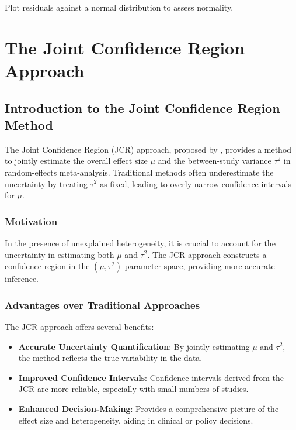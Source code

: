 \documentclass[12pt,a4paper]{report}
\begin{document}
Plot residuals against a normal distribution to assess normality.

\chapter{The Joint Confidence Region Approach}
\label{chap:jcr_approach}

\section{Introduction to the Joint Confidence Region Method}
\label{sec:intro_jcr}

The Joint Confidence Region (JCR) approach, proposed by \citet{yekutieli2019getting}, provides a method to jointly estimate the overall effect size $\mu$ and the between-study variance $\tau^2$ in random-effects meta-analysis. Traditional methods often underestimate the uncertainty by treating $\tau^2$ as fixed, leading to overly narrow confidence intervals for $\mu$.

\subsection{Motivation}
\label{subsec:jcr_motivation}

In the presence of unexplained heterogeneity, it is crucial to account for the uncertainty in estimating both $\mu$ and $\tau^2$. The JCR approach constructs a confidence region in the $(\mu, \tau^2)$ parameter space, providing more accurate inference.

\subsection{Advantages over Traditional Approaches}
\label{subsec:jcr_advantages}

The JCR approach offers several benefits:

\begin{itemize}
    \item \textbf{Accurate Uncertainty Quantification}: By jointly estimating $\mu$ and $\tau^2$, the method reflects the true variability in the data.
    \item \textbf{Improved Confidence Intervals}: Confidence intervals derived from the JCR are more reliable, especially with small numbers of studies.
    \item \textbf{Enhanced Decision-Making}: Provides a comprehensive picture of the effect size and heterogeneity, aiding in clinical or policy decisions.
\end{itemize}
\end{document}
